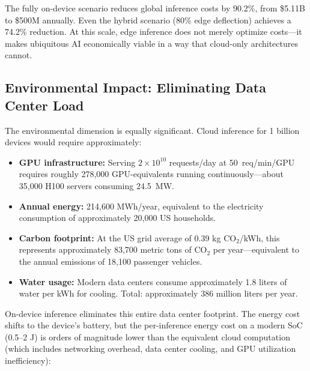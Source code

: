 \documentclass[12pt, letterpaper, twoside]{report}
\begin{document}
The fully on-device scenario reduces global inference costs by 90.2\%, from \$5.11B to \$500M annually. Even the hybrid scenario (80\% edge deflection) achieves a 74.2\% reduction. At this scale, edge inference does not merely optimize costs---it makes ubiquitous AI economically viable in a way that cloud-only architectures cannot.

\subsection{Environmental Impact: Eliminating Data Center Load}

The environmental dimension is equally significant. Cloud inference for 1 billion devices would require approximately:

\begin{itemize}[itemsep=1pt, topsep=2pt, parsep=0pt]
\item \textbf{GPU infrastructure:} Serving $2 \times 10^{10}$ requests/day at 50~req/\allowbreak min/\allowbreak GPU requires roughly 278,000 GPU-equivalents running continuously---about 35,000 H100 servers consuming 24.5~MW.
\item \textbf{Annual energy:} 214,600 MWh/year, equivalent to the electricity consumption of approximately 20,000 US households.
\item \textbf{Carbon footprint:} At the US grid average of 0.39 kg CO$_2$/kWh, this represents approximately 83,700 metric tons of CO$_2$ per year---equivalent to the annual emissions of 18,100 passenger vehicles.
\item \textbf{Water usage:} Modern data centers consume approximately 1.8 liters of water per kWh for cooling. Total: approximately 386 million liters per year.
\end{itemize}

On-device inference eliminates this entire data center footprint. The energy cost shifts to the device's battery, but the per-inference energy cost on a modern SoC (0.5--2 J) is orders of magnitude lower than the equivalent cloud computation (which includes networking overhead, data center cooling, and GPU utilization inefficiency):
\end{document}
